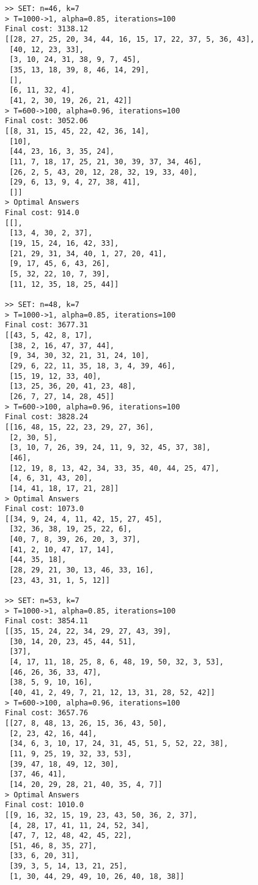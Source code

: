 \documentclass[12pt]{article}
\begin{document}
\begin{lstlisting}[breaklines=true]
>> SET: n=46, k=7
> T=1000->1, alpha=0.85, iterations=100
Final cost: 3138.12
[[28, 27, 25, 20, 34, 44, 16, 15, 17, 22, 37, 5, 36, 43],
 [40, 12, 23, 33],
 [3, 10, 24, 31, 38, 9, 7, 45],
 [35, 13, 18, 39, 8, 46, 14, 29],
 [],
 [6, 11, 32, 4],
 [41, 2, 30, 19, 26, 21, 42]]
> T=600->100, alpha=0.96, iterations=100
Final cost: 3052.06
[[8, 31, 15, 45, 22, 42, 36, 14],
 [10],
 [44, 23, 16, 3, 35, 24],
 [11, 7, 18, 17, 25, 21, 30, 39, 37, 34, 46],
 [26, 2, 5, 43, 20, 12, 28, 32, 19, 33, 40],
 [29, 6, 13, 9, 4, 27, 38, 41],
 []]
> Optimal Answers
Final cost: 914.0
[[],
 [13, 4, 30, 2, 37],
 [19, 15, 24, 16, 42, 33],
 [21, 29, 31, 34, 40, 1, 27, 20, 41],
 [9, 17, 45, 6, 43, 26],
 [5, 32, 22, 10, 7, 39],
 [11, 12, 35, 18, 25, 44]]

>> SET: n=48, k=7
> T=1000->1, alpha=0.85, iterations=100
Final cost: 3677.31
[[43, 5, 42, 8, 17],
 [38, 2, 16, 47, 37, 44],
 [9, 34, 30, 32, 21, 31, 24, 10],
 [29, 6, 22, 11, 35, 18, 3, 4, 39, 46],
 [15, 19, 12, 33, 40],
 [13, 25, 36, 20, 41, 23, 48],
 [26, 7, 27, 14, 28, 45]]
> T=600->100, alpha=0.96, iterations=100
Final cost: 3828.24
[[16, 48, 15, 22, 23, 29, 27, 36],
 [2, 30, 5],
 [3, 10, 7, 26, 39, 24, 11, 9, 32, 45, 37, 38],
 [46],
 [12, 19, 8, 13, 42, 34, 33, 35, 40, 44, 25, 47],
 [4, 6, 31, 43, 20],
 [14, 41, 18, 17, 21, 28]]
> Optimal Answers
Final cost: 1073.0
[[34, 9, 24, 4, 11, 42, 15, 27, 45],
 [32, 36, 38, 19, 25, 22, 6],
 [40, 7, 8, 39, 26, 20, 3, 37],
 [41, 2, 10, 47, 17, 14],
 [44, 35, 18],
 [28, 29, 21, 30, 13, 46, 33, 16],
 [23, 43, 31, 1, 5, 12]]

>> SET: n=53, k=7
> T=1000->1, alpha=0.85, iterations=100
Final cost: 3854.11
[[35, 15, 24, 22, 34, 29, 27, 43, 39],
 [30, 14, 20, 23, 45, 44, 51],
 [37],
 [4, 17, 11, 18, 25, 8, 6, 48, 19, 50, 32, 3, 53],
 [46, 26, 36, 33, 47],
 [38, 5, 9, 10, 16],
 [40, 41, 2, 49, 7, 21, 12, 13, 31, 28, 52, 42]]
> T=600->100, alpha=0.96, iterations=100
Final cost: 3657.76
[[27, 8, 48, 13, 26, 15, 36, 43, 50],
 [2, 23, 42, 16, 44],
 [34, 6, 3, 10, 17, 24, 31, 45, 51, 5, 52, 22, 38],
 [11, 9, 25, 19, 32, 33, 53],
 [39, 47, 18, 49, 12, 30],
 [37, 46, 41],
 [14, 20, 29, 28, 21, 40, 35, 4, 7]]
> Optimal Answers
Final cost: 1010.0
[[9, 16, 32, 15, 19, 23, 43, 50, 36, 2, 37],
 [4, 28, 17, 41, 11, 24, 52, 34],
 [47, 7, 12, 48, 42, 45, 22],
 [51, 46, 8, 35, 27],
 [33, 6, 20, 31],
 [39, 3, 5, 14, 13, 21, 25],
 [1, 30, 44, 29, 49, 10, 26, 40, 18, 38]]


\end{lstlisting}
\end{document}
